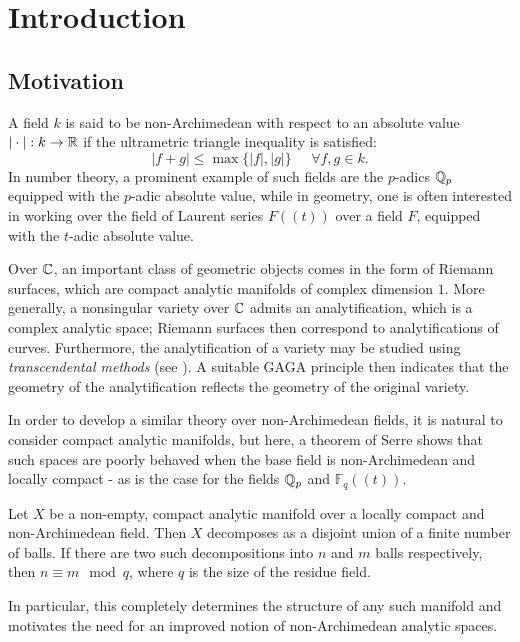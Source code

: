 
\chapter{Introduction}

\section{Motivation}

A field $k$ is said to be non-Archimedean with respect to an absolute value  ${|\cdot|: k \to \mathbb{R}}$ if the ultrametric triangle inequality is satisfied:
\[
|f + g| \leq \max\{|f|, |g|\} \; \; \; \; \; \forall f, g \in k.
\]
In number theory, a prominent example of such fields are the $p$-adics $\mathbb{Q}_p$ equipped with the $p$-adic absolute value, while in geometry, one is often interested in working over the field of Laurent series $F((t))$ over a field $F$, equipped with the $t$-adic absolute value.

Over $\mathbb{C}$, an important class of geometric objects comes in the form of Riemann surfaces, which are compact analytic manifolds of complex dimension $1$. 
More generally, a nonsingular variety over $\mathbb{C}$ admits an analytification, which is a complex analytic space; Riemann surfaces then correspond to analytifications of curves. 
Furthermore, the analytification of a variety may be studied using \textit{transcendental methods} (see \parencite[Appendix B]{hartshorne}).
A suitable GAGA principle then indicates that the geometry of the analytification reflects the geometry of the original variety.

In order to develop a similar theory over non-Archimedean fields, it is natural to consider compact analytic manifolds, but here, a theorem of Serre shows that such spaces are poorly behaved when the base field is non-Archimedean and locally compact - as is the case for the fields $\mathbb{Q}_p$ and $\mathbb{F}_q((t))$.

\begin{theorem}\parencite[Appendix 2]{serre}
    Let $X$ be a non-empty, compact analytic manifold over a locally compact and non-Archimedean field. Then $X$ decomposes as a disjoint union of a finite number of balls. If there are two such decompositions into $n$ and $m$ balls respectively, then $n \equiv m \mod q$, where $q$ is the size of the residue field.
\end{theorem}

In particular, this completely determines the structure of any such manifold and motivates the need for an improved notion of non-Archimedean analytic spaces. 


